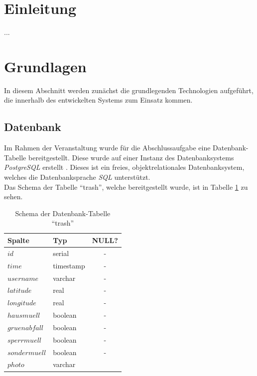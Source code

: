 \documentclass[a4paper, 11pt, DIV=11, listof=numbered, numbers=noenddot]{scrartcl}
\begin{document}
	\section{Einleitung}
	...

	\section{Grundlagen}
	In diesem Abschnitt werden zunächst die grundlegenden Technologien aufgeführt, die innerhalb des entwickelten Systems zum Einsatz kommen.

	\subsection{Datenbank}
	Im Rahmen der Veranstaltung wurde für die Abschlussaufgabe eine Datenbank-Tabelle bereitgestellt.
	Diese wurde auf einer Instanz des Datenbanksystems \textit{PostgreSQL} erstellt \cite{@Postgresql}.
	Dieses ist ein freies, objektrelationales Datenbanksystem, welches die Datenbanksprache \textit{SQL} unterstützt.\\
	Das Schema der Tabelle \enquote{trash}, welche bereitgestellt wurde, ist in Tabelle \ref{table:db} zu sehen.

	\begin{table}[h]
		\begin{center}
	
		\begin{tabular}{|l|l|c|}
			\hline
			\textbf{Spalte} & \textbf{Typ} & \textbf{NULL?} \\ \hline
			$id$              & serial        & -                 					\\ \hline
			$time$            & timestamp     & -                 					\\ \hline
			$username$        & varchar       & -                 					\\ \hline
			$latitude$        & real          & -                 					\\ \hline
			$longitude$       & real          & -                 					\\ \hline
			$hausmuell$       & boolean       & -                 					\\ \hline
			$gruenabfall$     & boolean       & -                 					\\ \hline
			$sperrmuell$      & boolean       & -                 					\\ \hline
			$sondermuell$     & boolean       & -                 					\\ \hline
			$photo$           & varchar       & \checkmark                 	\\ \hline
		\end{tabular}
	\caption{Schema der Datenbank-Tabelle \enquote{trash}}
	\label{table:db} 
		\end{center}
	\end{table}
	
\end{document}
